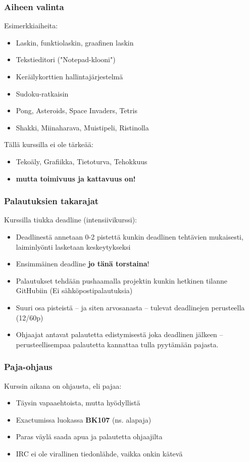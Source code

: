 \documentclass[finnish]{beamer}
\begin{document}
	\begin{frame}
		\frametitle{Aiheen valinta}
		
		Esimerkkiaiheita:
		\begin{itemize}
			\item Laskin, funktiolaskin, graafinen laskin
			\item Tekstieditori ("Notepad-klooni")
			\item Keräilykorttien hallintajärjestelmä
			\item Sudoku-ratkaisin
			\item Pong, Asteroids, Space Invaders, Tetris
			\item Shakki, Miinaharava, Muistipeli, Ristinolla
		\end{itemize}
		
		Tällä kurssilla ei ole tärkeää:
		\begin{itemize}
			\item Tekoäly, Grafiikka, Tietoturva, Tehokkuus
			\item \textbf{mutta toimivuus ja kattavuus on!}
		\end{itemize}
	\end{frame}
	
	\begin{frame}
		\frametitle{Palautuksien takarajat}

		Kurssilla tiukka deadline (intensiivikurssi):
		\begin{itemize}
			\item Deadlinestä annetaan 0-2 pistettä kunkin deadlinen tehtävien mukaisesti, laiminlyönti lasketaan keskeytykseksi
			\item Ensimmäinen deadline \textbf{jo tänä torstaina}!
			\item Palautukset tehdään pushaamalla projektin kunkin hetkinen tilanne GitHubiin (Ei sähköpostipalautuksia)
			\item Suuri osa pisteistä -- ja siten arvosanasta -- tulevat deadlinejen perusteella (12/60p)
			\item Ohjaajat antavat palautetta edistymisestä joka deadlinen jälkeen -- perusteellisempaa palautetta kannattaa tulla pyytämään pajasta.
		\end{itemize}
	\end{frame}
	
	\begin{frame}
		\frametitle{Paja-ohjaus}

		Kurssin aikana on ohjausta, eli pajaa:
		\begin{itemize}
			\item Täysin vapaaehtoista, mutta hyödyllistä
			\item Exactumissa luokassa \textbf{BK107} (ns. alapaja)
			\item Paras väylä saada apua ja palautetta ohjaajilta
			\item IRC ei ole virallinen tiedonlähde, vaikka onkin kätevä
		\end{itemize}
	\end{frame}
	
\end{document}
